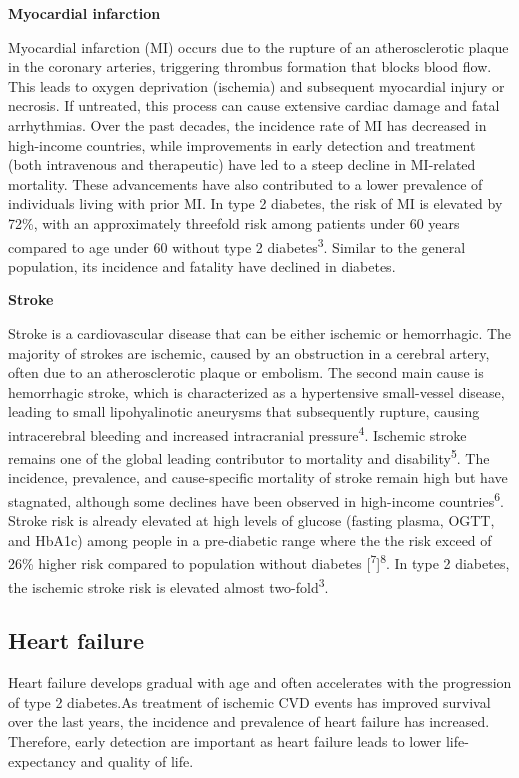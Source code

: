 \documentclass[
  a4paper,
  headsepline=true,
  open=any]{scrbook}
\begin{document}
\textbf{Myocardial infarction}

Myocardial infarction (MI) occurs due to the rupture of an
atherosclerotic plaque in the coronary arteries, triggering thrombus
formation that blocks blood flow. This leads to oxygen deprivation
(ischemia) and subsequent myocardial injury or necrosis. If untreated,
this process can cause extensive cardiac damage and fatal arrhythmias.
Over the past decades, the incidence rate of MI has decreased in
high-income countries, while improvements in early detection and
treatment (both intravenous and therapeutic) have led to a steep decline
in MI-related mortality. These advancements have also contributed to a
lower prevalence of individuals living with prior MI. In type 2
diabetes, the risk of MI is elevated by 72\%, with an approximately
threefold risk among patients under 60 years compared to age under 60
without type 2 diabetes\textsuperscript{3}. Similar to the general
population, its incidence and fatality have declined in diabetes.

\textbf{Stroke}

Stroke is a cardiovascular disease that can be either ischemic or
hemorrhagic. The majority of strokes are ischemic, caused by an
obstruction in a cerebral artery, often due to an atherosclerotic plaque
or embolism. The second main cause is hemorrhagic stroke, which is
characterized as a hypertensive small-vessel disease, leading to small
lipohyalinotic aneurysms that subsequently rupture, causing
intracerebral bleeding and increased intracranial
pressure\textsuperscript{4}. Ischemic stroke remains one of the global
leading contributor to mortality and disability\textsuperscript{5}. The
incidence, prevalence, and cause-specific mortality of stroke remain
high but have stagnated, although some declines have been observed in
high-income countries\textsuperscript{6}. Stroke risk is already
elevated at high levels of glucose (fasting plasma, OGTT, and HbA1c)
among people in a pre-diabetic range where the the risk exceed of 26\%
higher risk compared to population without diabetes
{[}\textsuperscript{7}{]}\textsuperscript{8}. In type 2 diabetes, the
ischemic stroke risk is elevated almost two-fold\textsuperscript{3}.

\hypertarget{heart-failure}{%
\subsection{Heart failure}\label{heart-failure}}

Heart failure develops gradual with age and often accelerates with the
progression of type 2 diabetes.As treatment of ischemic CVD events has
improved survival over the last years, the incidence and prevalence of
heart failure has increased. Therefore, early detection are important as
heart failure leads to lower life-expectancy and quality of life.
\end{document}
